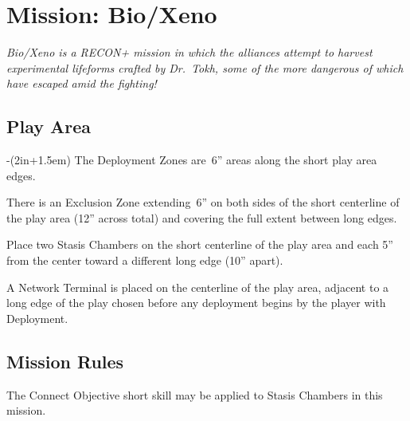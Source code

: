 \chapter{Mission: Bio/Xeno}

\emph{\emph{Bio/Xeno} is a RECON+ mission in which the alliances
  attempt to harvest experimental lifeforms crafted by Dr.~Tokh, some
  of the more dangerous of which have escaped amid the fighting!}

\section{Play Area}
\vspace{-2\parskip}
\noindent\begin{stdminipage}{\linewidth-(2in+1.5em)}
\vspace{0pt}   
\noindent
The Deployment Zones are~6'' areas along the short play area edges.


There is an Exclusion Zone extending~6'' on both sides of the short
centerline of the play area (12'' across total) and covering the full
extent between long edges.

Place two Stasis Chambers on the short centerline of the play area and
each 5'' from the center toward a different long edge (10'' apart).

A Network Terminal is placed on the centerline of the play area,
adjacent to a long edge of the play chosen before any deployment
begins by the player with Deployment.

\section{Mission Rules}

The Connect Objective short skill may be applied to Stasis Chambers in
this mission.

\end{stdminipage}
\hfill
